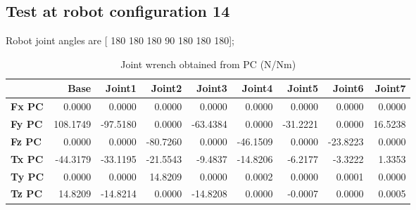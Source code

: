 
\subsection{Test at robot configuration 14}
Robot joint angles are  [ 180  180  180   90  180  180  180];

\begin{table}[h!]
	\centering
	\caption{Joint wrench obtained from PC (N/Nm)}
	\label{wrech_PC_Pose14}
	\begin{tabular}{|l|r|r|r|r|r|r|r|r|}
		\hline
		\textbf{}  & \textbf{Base} & \textbf{Joint1}  & \textbf{Joint2}  & \textbf{Joint3}  & \textbf{Joint4}  & \textbf{Joint5}  & \textbf{Joint6}  & \textbf{Joint7} \\ \hline
		\textbf{Fx PC}  & 0.0000        & 0.0000        & 0.0000        & 0.0000        & 0.0000        & 0.0000        & 0.0000        & 0.0000 \\ \hline
		\textbf{Fy PC}  & 108.1749        & -97.5180        & 0.0000        & -63.4384        & 0.0000        & -31.2221        & 0.0000        & 16.5238 \\ \hline
		\textbf{Fz PC}  & 0.0000        & 0.0000        & -80.7260        & 0.0000        & -46.1509        & 0.0000        & -23.8223        & 0.0000 \\ \hline
		\textbf{Tx PC}  & -44.3179        & -33.1195        & -21.5543        & -9.4837        & -14.8206        & -6.2177        & -3.3222        & 1.3353 \\ \hline
		\textbf{Ty PC}  & 0.0000        & 0.0000        & 14.8209        & 0.0000        & 0.0002        & 0.0000        & 0.0001        & 0.0000 \\ \hline
		\textbf{Tz PC}  & 14.8209        & -14.8214        & 0.0000        & -14.8208        & 0.0000        & -0.0007        & 0.0000        & 0.0005 \\ \hline
	\end{tabular}
\end{table}

